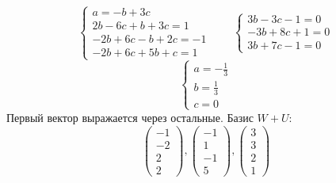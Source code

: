 \begin{itemize}
$$    \begin{cases}
    	a = -b + 3c \\
        2b - 6c + b + 3c = 1 \\
        -2b + 6c - b + 2c = - 1 \\
        -2b + 6c + 5b + c = 1
    \end{cases} \qquad
    \begin{cases}
    	3b - 3c - 1 = 0 \\
        -3b + 8c + 1 = 0 \\
        3b + 7c - 1 = 0
    \end{cases} $$
    $$
    \begin{cases}
    	a = -\frac13 \\
        b = \frac13 \\
        c = 0
    \end{cases} $$
    Первый вектор выражается через остальные. Базис $ W + U $:
    $$
    \begin{pmatrix}
    	-1 \\
        -2 \\
        2 \\
        2
    \end{pmatrix},
    \begin{pmatrix}
    	-1 \\
        1 \\
        -1 \\
        5
    \end{pmatrix},
    \begin{pmatrix}
    	3 \\
        3 \\
        2 \\
        1
    \end{pmatrix} $$
\end{itemize}
